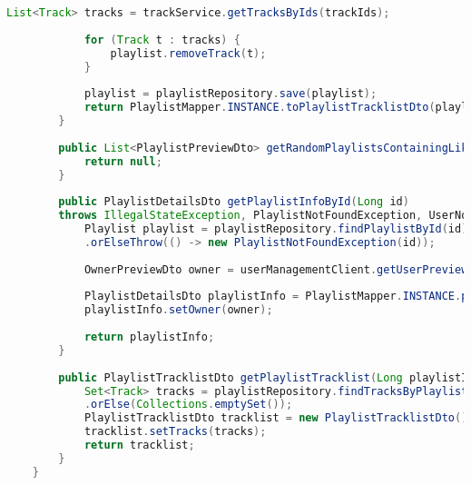 \begin{lstlisting}[language=java]
			List<Track> tracks = trackService.getTracksByIds(trackIds);
			
			for (Track t : tracks) {
				playlist.removeTrack(t);
			}
			
			playlist = playlistRepository.save(playlist);
			return PlaylistMapper.INSTANCE.toPlaylistTracklistDto(playlist);
		}
		
		public List<PlaylistPreviewDto> getRandomPlaylistsContainingLikedTracks() {
			return null;
		}
		
		public PlaylistDetailsDto getPlaylistInfoById(Long id)
		throws IllegalStateException, PlaylistNotFoundException, UserNotFoundException {
			Playlist playlist = playlistRepository.findPlaylistById(id)
			.orElseThrow(() -> new PlaylistNotFoundException(id));
			
			OwnerPreviewDto owner = userManagementClient.getUserPreview(playlist.getUserId());
			
			PlaylistDetailsDto playlistInfo = PlaylistMapper.INSTANCE.playlistToPlaylistInfoDto(playlist);
			playlistInfo.setOwner(owner);
			
			return playlistInfo;
		}
		
		public PlaylistTracklistDto getPlaylistTracklist(Long playlistId) {
			Set<Track> tracks = playlistRepository.findTracksByPlaylistId(playlistId)
			.orElse(Collections.emptySet());
			PlaylistTracklistDto tracklist = new PlaylistTracklistDto();
			tracklist.setTracks(tracks);
			return tracklist;
		}
	}
	
\end{lstlisting}

